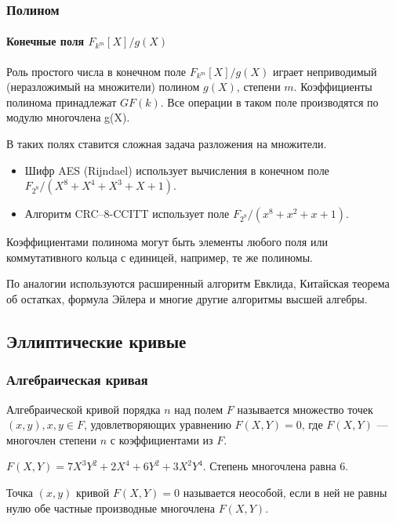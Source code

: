 \begin{frame}
    \frametitle{Полином}
    \framesubtitle{Конечные поля $F_{k^m}[X]/g(X)$}
    
    Роль простого числа в конечном поле $F_{k^m}[X]/g(X)$ играет \alert{неприводимый} (неразложимый на множители) полином $g(X)$, степени $m$. Коэффициенты полинома принадлежат $GF(k)$. Все операции в таком поле производятся \alert{по модулю} многочлена g(X).

    В таких полях ставится сложная задача разложения на множители.
    
    \begin{example}
        \begin{itemize}
            \item Шифр AES (Rijndael) использует вычисления в конечном поле $F_{2^8}/(X^8+X^4+X^3+X+1)$. 
            \item Алгоритм CRC--8-CCITT использует поле $F_{2^8}/(x^8 + x^2 + x + 1)$.
        \end{itemize}
    \end{example}
    
    Коэффициентами полинома могут быть элементы любого поля или коммутативного кольца с единицей, например, те же полиномы.
\end{frame}

По аналогии используются расширенный алгоритм Евклида, Китайская теорема об остатках, формула Эйлера и многие другие алгоритмы высшей алгебры.


\subsection{Эллиптические кривые}


\begin{frame}
    \frametitle{Алгебраическая кривая}
    
    \begin{definition}
        Алгебраической кривой порядка $n$ над полем $F$ называется множество точек $(x, y), x,y\in F$, удовлетворяющих уравнению $F(X,Y)=0$, где $F(X,Y)$ --- многочлен степени $n$  с коэффициентами из $F$.
    \end{definition}

    \begin{example}
        $F(X, Y)=7X^3Y^2+2X^4+6Y^2+3X^2Y^4$. Степень многочлена равна $6$.
    \end{example}

    Точка $(x,y)$ кривой $F(X,Y)=0$ называется \alert{неособой}, если в ней не равны нулю обе частные производные многочлена $F(X,Y)$.
\end{frame}



